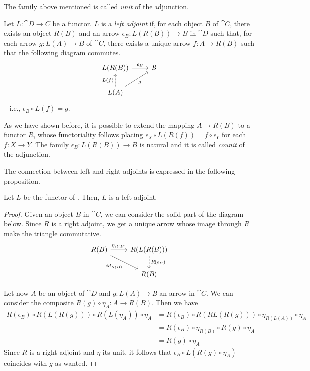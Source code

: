 \begin{remark}
    The family above mentioned is called \emph{unit} of the adjunction.
\end{remark}

\begin{definition}\label{def:left_adjoint}
    Let $L: \cat{D \rightarrow C}$ be a functor. $L$ is a \emph{left adjoint} if, for each object $B$ of $\cat C$, there exists an object $R(B)$ and an arrow $\epsilon_B : L(R(B)) \rightarrow B$ in $\cat D$ such that, for each arrow $g: L(A) \rightarrow B$ of $\cat C$, there exists a unique arrow $f:A \rightarrow R(B)$ such that the following diagram commutes.
    \[
        \begin{tikzcd}
            L(R(B)) \arrow[r, "{\epsilon_B}"] & B \\
            L(A) \arrow[u, dashed, "L(f)"] \arrow[ur, "g"swap]
        \end{tikzcd}
    \]
    -- i.e., $\epsilon_B \circ L(f) = g$.
\end{definition}

As we have shown before, it is possible to extend the mapping $A \rightarrow R(B)$ to a functor $R$, whose functoriality follows placing $\epsilon_X \circ L(R(f)) = f \circ \epsilon_Y$ for each $f: X \rightarrow Y$. The family $\epsilon_B : L(R(B)) \rightarrow B$ is natural and it is called \emph{counit} of the adjunction.

The connection between left and right adjoints is expressed in the following proposition.

\begin{prop}
    Let $L$ be the functor of . Then, $L$ is a left adjoint.
\end{prop}

\begin{proof}
	Given an object $B$ in $\cat{C}$, we can consider the solid part of the diagram below. 
	Since $R$ is a right adjoint, we get a unique arrow whose image through $R$ make the triangle commutative.
	    \[
	\begin{tikzcd}
		R(B)\arrow[r, "{\eta_{R(B)}}"] \arrow[dr, "id_{R(B)}" swap] & R(L(R(B))) \arrow[d, dashed, "R(\epsilon_B)"] \\
		& R(B)
	\end{tikzcd}
	\]
	
	Let now $A$ be an object of $\cat{D}$ and $g\colon L(A)\to B$ an arrow in $\cat{C}$. We can consider the composite $R(g)\circ \eta_A\colon A\to R(B)$. Then we have
	\begin{align*}
		R(\epsilon_B)\circ R(L(R(g)))\circ R(L(\eta_A))\circ \eta_A&=R(\epsilon_B)\circ R(RL(R(g)))\circ \eta_{R(L(A))}\circ \eta_A\\&=R(\epsilon_B)\circ \eta_{R(B)}\circ R(g)\circ \eta_A\\&=R(g)\circ \eta_A
	\end{align*}
	Since $R$ is a right adjoint and $\eta$ its unit, it follows that $\epsilon_B\circ L(R(g)\circ \eta_A)$ coincides with $g$ as wanted.
 \end{proof}

